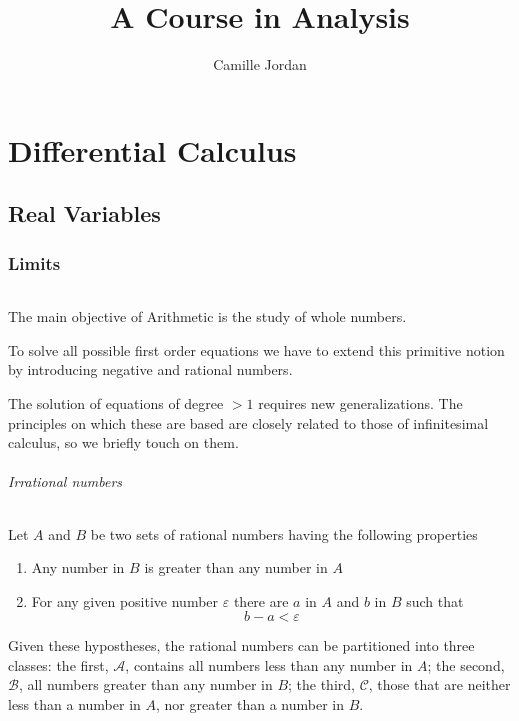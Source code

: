 \documentclass[10pt,letterpaper]{book}
\title{A Course in Analysis}
\author{Camille Jordan}
\renewcommand\epsilon{\varepsilon}
\theoremstyle{definition}
\begin{document}
\maketitle
\tableofcontents


\part{Differential Calculus}

\chapter{Real Variables}

\section{Limits}

\paragraph{} 
The main objective of Arithmetic is the study of whole numbers.

To solve all possible first order equations we have to extend this primitive notion by introducing negative and rational numbers.

The solution of equations of degree $> 1$ requires new generalizations. The principles on which these are based are closely related to those of infinitesimal calculus, so we briefly touch on them.


\paragraph{Irrational numbers}\label{par:irrational-numbers} Let $A$ and $B$ be two sets of rational numbers having the following properties
\begin{enumerate}
\item Any number in $B$ is greater than any number in $A$
\item For any given positive number $\epsilon$ there are $a$ in $A$ and $b$ in $B$ such that
\[
  b - a < \epsilon
\]
\end{enumerate}
Given these hypostheses, the rational numbers can be partitioned into three classes: the first, $\mathcal{A}$, contains all numbers less than any number in $A$; the second, $\mathcal B$, all numbers greater than any number in $B$; the third, $\mathcal C$, those that are neither less than a number in $A$, nor greater than a number in $B$.
\end{document}
